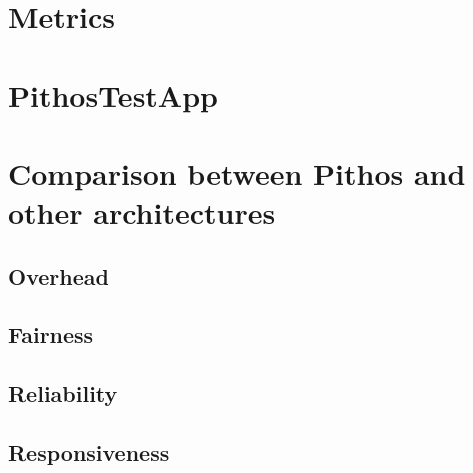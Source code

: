     \section{Metrics}

    \section{PithosTestApp}

    \section{Comparison between Pithos and other architectures}

        \subsection{Overhead}
        \subsection{Fairness}
        \subsection{Reliability}
        \subsection{Responsiveness}
